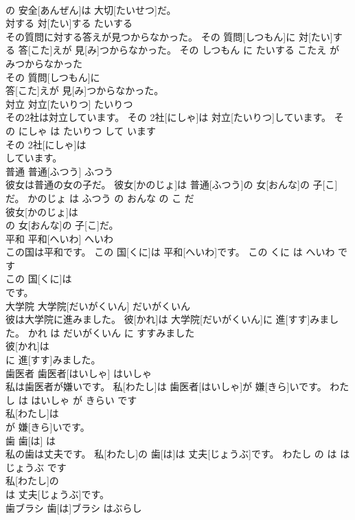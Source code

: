 \documentclass[8pt]{extreport}
\begin{document}
\begin{CJK}{UTF8}{min}
\\	の 安全[あんぜん]は 大切[たいせつ]だ。			
\\	対する	対[たい]する	たいする	
\\	その質問に対する答えが見つからなかった。	その 質問[しつもん]に 対[たい]する 答[こた]えが 見[み]つからなかった。	その しつもん に たいする こたえ が みつからなかった	
\\	その 質問[しつもん]に
\\	答[こた]えが 見[み]つからなかった。			
\\	対立	対立[たいりつ]	たいりつ	
\\	その2社は対立しています。	その 2社[にしゃ]は 対立[たいりつ]しています。	その にしゃ は たいりつ して います	
\\	その 2社[にしゃ]は
\\	しています。			
\\	普通	普通[ふつう]	ふつう	
\\	彼女は普通の女の子だ。	彼女[かのじょ]は 普通[ふつう]の 女[おんな]の 子[こ]だ。	かのじょ は ふつう の おんな の こ だ	
\\	彼女[かのじょ]は
\\	の 女[おんな]の 子[こ]だ。			
\\	平和	平和[へいわ]	へいわ	
\\	この国は平和です。	この 国[くに]は 平和[へいわ]です。	この くに は へいわ です	
\\	この 国[くに]は
\\	です。			
\\	大学院	大学院[だいがくいん]	だいがくいん	
\\	彼は大学院に進みました。	彼[かれ]は 大学院[だいがくいん]に 進[すす]みました。	かれ は だいがくいん に すすみました	
\\	彼[かれ]は
\\	に 進[すす]みました。			
\\	歯医者	歯医者[はいしゃ]	はいしゃ	
\\	私は歯医者が嫌いです。	私[わたし]は 歯医者[はいしゃ]が 嫌[きら]いです。	わたし は はいしゃ が きらい です	
\\	私[わたし]は
\\	が 嫌[きら]いです。			
\\	歯	歯[は]	は	
\\	私の歯は丈夫です。	私[わたし]の 歯[は]は 丈夫[じょうぶ]です。	わたし の は は じょうぶ です	
\\	私[わたし]の
\\	は 丈夫[じょうぶ]です。			
\\	歯ブラシ	歯[は]ブラシ	はぶらし	

\end{CJK}
\end{document}
